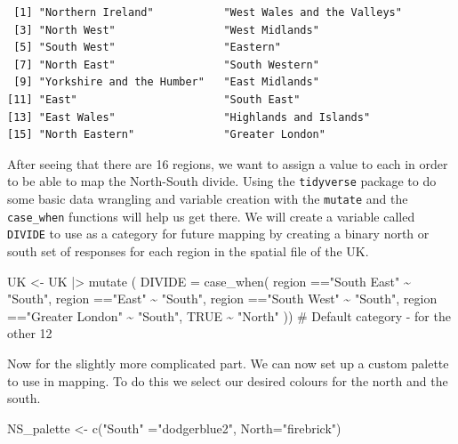 \documentclass[
  letterpaper,
  DIV=11,
  numbers=noendperiod]{scrartcl}
\newenvironment{Shaded}{\begin{snugshade}}{\end{snugshade}}
\newcommand{\AttributeTok}[1]{\textcolor[rgb]{0.40,0.45,0.13}{#1}}
\newcommand{\CommentTok}[1]{\textcolor[rgb]{0.37,0.37,0.37}{#1}}
\newcommand{\ConstantTok}[1]{\textcolor[rgb]{0.56,0.35,0.01}{#1}}
\newcommand{\FunctionTok}[1]{\textcolor[rgb]{0.28,0.35,0.67}{#1}}
\newcommand{\NormalTok}[1]{\textcolor[rgb]{0.00,0.23,0.31}{#1}}
\newcommand{\OtherTok}[1]{\textcolor[rgb]{0.00,0.23,0.31}{#1}}
\newcommand{\SpecialCharTok}[1]{\textcolor[rgb]{0.37,0.37,0.37}{#1}}
\newcommand{\StringTok}[1]{\textcolor[rgb]{0.13,0.47,0.30}{#1}}
\begin{document}
\begin{verbatim}
 [1] "Northern Ireland"           "West Wales and the Valleys"
 [3] "North West"                 "West Midlands"             
 [5] "South West"                 "Eastern"                   
 [7] "North East"                 "South Western"             
 [9] "Yorkshire and the Humber"   "East Midlands"             
[11] "East"                       "South East"                
[13] "East Wales"                 "Highlands and Islands"     
[15] "North Eastern"              "Greater London"            
\end{verbatim}

After seeing that there are 16 regions, we want to assign a value to
each in order to be able to map the North-South divide. Using the
\texttt{tidyverse} package to do some basic data wrangling and variable
creation with the \texttt{mutate} and the \texttt{case\_when} functions
will help us get there. We will create a variable called \texttt{DIVIDE}
to use as a category for future mapping by creating a binary north or
south set of responses for each region in the spatial file of the UK.

\begin{Shaded}
\begin{Highlighting}[]
\NormalTok{UK }\OtherTok{\textless{}{-}}\NormalTok{ UK }\SpecialCharTok{|\textgreater{}}
  \FunctionTok{mutate}\NormalTok{ ( }\AttributeTok{DIVIDE =} \FunctionTok{case\_when}\NormalTok{(}
\NormalTok{    region }\SpecialCharTok{==}\StringTok{"South East"} \SpecialCharTok{\textasciitilde{}} \StringTok{"South"}\NormalTok{,}
\NormalTok{    region }\SpecialCharTok{==}\StringTok{"East"} \SpecialCharTok{\textasciitilde{}} \StringTok{"South"}\NormalTok{,}
\NormalTok{    region }\SpecialCharTok{==}\StringTok{"South West"} \SpecialCharTok{\textasciitilde{}} \StringTok{"South"}\NormalTok{,}
\NormalTok{    region }\SpecialCharTok{==}\StringTok{"Greater London"} \SpecialCharTok{\textasciitilde{}} \StringTok{"South"}\NormalTok{,}
    \ConstantTok{TRUE} \SpecialCharTok{\textasciitilde{}} \StringTok{"North"}\NormalTok{ )) }\CommentTok{\# Default category {-} for the other 12}
\end{Highlighting}
\end{Shaded}

Now for the slightly more complicated part. We can now set up a custom
palette to use in mapping. To do this we select our desired colours for
the north and the south.

\begin{Shaded}
\begin{Highlighting}[]
\NormalTok{NS\_palette }\OtherTok{\textless{}{-}} \FunctionTok{c}\NormalTok{(}\StringTok{"South"} \OtherTok{=}\StringTok{"dodgerblue2"}\NormalTok{, }\AttributeTok{North=}\StringTok{"firebrick"}\NormalTok{)}
\end{Highlighting}
\end{Shaded}
\end{document}
